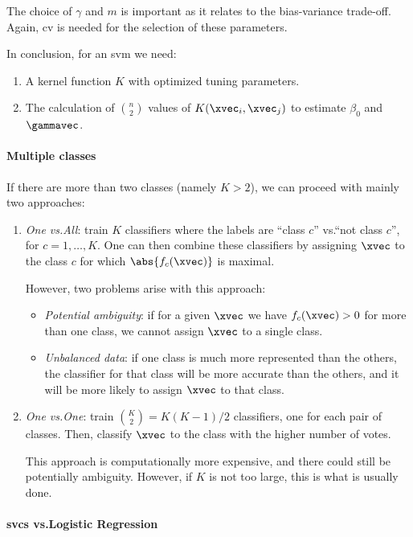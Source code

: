 The choice of $\gamma$ and $m$ is important as it relates to the bias-variance trade-off. Again, \acs{cv} is needed for the selection of these parameters.

In conclusion, for an \acs{svm} we need:
\begin{enumerate}
    \item A kernel function $K$ with optimized tuning parameters.
    \item The calculation of $\binom{n}{2}$ values of $K(\xvec_i, \xvec_j)$ to estimate $\beta_0$ and $\gammavec$.
\end{enumerate}

\paragraph{Multiple classes}

If there are more than two classes (namely $K > 2$), we can proceed with mainly two approaches:
\begin{enumerate}
    \item \emph{One vs.\@ All}: train $K$ classifiers where the labels are ``class $c$'' vs.\@ ``not class $c$''\negthinspace, for $c = 1, \dots, K$. One can then combine these classifiers by assigning $\xvec$ to the class $c$ for which $\abs{f_c(\xvec)}$ is maximal.

          However, two problems arise with this approach:
          \begin{itemize}[beginpenalty=10000]
              \item \emph{Potential ambiguity}: if for a given $\xvec$ we have $f_c(\xvec) > 0$ for more than one class, we cannot assign $\xvec$ to a single class.
              \item \emph{Unbalanced data}: if one class is much more represented than the others, the classifier for that class will be more accurate than the others, and it will be more likely to assign $\xvec$ to that class.
          \end{itemize}
    \item \emph{One vs.\@ One}: train $\binom{K}{2} = K(K-1)/2$ classifiers, one for each pair of classes. Then, classify $\xvec$ to the class with the higher number of votes.

          This approach is computationally more expensive, and there could still be potentially ambiguity. However, if $K$ is not too large, this is what is usually done.
\end{enumerate}

\paragraph{\acsp{svc} vs.\@ Logistic Regression}

